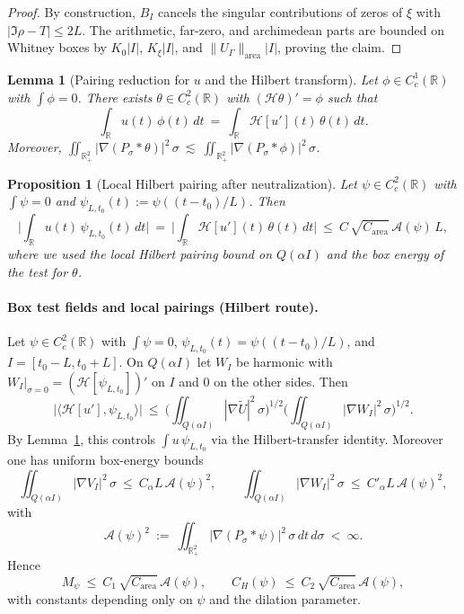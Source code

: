 \documentclass[11pt]{article}
\newtheorem{proposition}[theorem]{Proposition}
\newtheorem{lemma}[theorem]{Lemma}
\theoremstyle{definition}
\theoremstyle{remark}
\newcommand{\R}{\mathbb{R}}
\begin{document}
\begin{proof}
By construction, $B_I$ cancels the singular contributions of zeros of $\xi$ with $|\Im\rho-T|\le 2L$. The arithmetic, far-zero, and archimedean parts are bounded on Whitney boxes by $K_0|I|$, $K_\xi|I|$, and $\|U_\Gamma\|_{\mathrm{area}}|I|$, proving the claim.
\end{proof}

\begin{lemma}[Pairing reduction for $u$ and the Hilbert transform]\label{lem:pairing-reduction}
Let $\phi\in C_c^1(\R)$ with $\int\phi=0$. There exists $\theta\in C_c^2(\R)$ with $(\mathcal H\theta)'=\phi$ such that
\[\int_\R u(t)\,\phi(t)\,dt\ =\ \int_\R \mathcal H[u'](t)\,\theta(t)\,dt.\]
Moreover, $\iint_{\R^2_+}|\nabla(P_\sigma*\theta)|^2\,\sigma\ \lesssim\ \iint_{\R^2_+}|\nabla(P_\sigma*\phi)|^2\,\sigma$.
\end{lemma}

\begin{proposition}[Local Hilbert pairing after neutralization]\label{prop:pairing-neutralized}
Let $\psi\in C_c^2(\R)$ with $\int\psi=0$ and $\psi_{L,t_0}(t):=\psi((t-t_0)/L)$. Then
\[ \Big|\int_{\R} u(t)\,\psi_{L,t_0}(t)\,dt\Big|\ =\ \Big|\int_{\R} \mathcal H[u'](t)\,\theta(t)\,dt\Big|\ \le\ C\,\sqrt{C_{\mathrm{area}}}\,\mathcal A(\psi)\,L, \]
where we used the local Hilbert pairing bound on $Q(\alpha I)$ and the box energy of the test for $\theta$.
\end{proposition}

\paragraph{Box test fields and local pairings (Hilbert route).}
Let $\psi\in C_c^2(\R)$ with $\int\psi=0$, $\psi_{L,t_0}(t)=\psi((t-t_0)/L)$, and $I=[t_0-L,t_0+L]$. On $Q(\alpha I)$ let $W_I$ be harmonic with $W_I|_{\sigma=0}=(\mathcal H[\psi_{L,t_0}])'$ on $I$ and $0$ on the other sides. Then
\[
  \Big|\langle \mathcal H[u'],\psi_{L,t_0}\rangle\Big|\ \le\ \Big(\iint_{Q(\alpha I)}|\nabla\widetilde U|^2\,\sigma\Big)^{1/2}\Big(\iint_{Q(\alpha I)}|\nabla W_I|^2\,\sigma\Big)^{1/2}.
\]
By Lemma~\ref{lem:pairing-reduction}, this controls $\int u\,\psi_{L,t_0}$ via the Hilbert-transfer identity. Moreover one has uniform box-energy bounds
\[
  \iint_{Q(\alpha I)}|\nabla V_I|^2\,\sigma\ \le\ C_\alpha L\,\mathcal A(\psi)^2,\qquad
  \iint_{Q(\alpha I)}|\nabla W_I|^2\,\sigma\ \le\ C'_\alpha L\,\mathcal A(\psi)^2,
\]
with
\[
  \mathcal A(\psi)^2\ :=\ \iint_{\R^2_+}|\nabla(P_\sigma*\psi)|^2\,\sigma\,dt\,d\sigma\ <\ \infty.
\]
Hence
\[
  M_\psi\ \le\ C_1\,\sqrt{C_{\mathrm{area}}}\,\mathcal A(\psi),\qquad
  C_H(\psi)\ \le\ C_2\,\sqrt{C_{\mathrm{area}}}\,\mathcal A(\psi),
\]
with constants depending only on $\psi$ and the dilation parameter.
\end{document}
